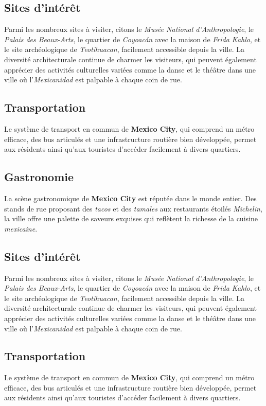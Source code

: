 \documentclass[12pt, a4paper]{article}
\begin{document}
\subsection*{\textbf{Sites d'intérêt}}

Parmi les nombreux sites à visiter, citons le \textit{Musée National d'Anthropologie}, le \textit{Palais des Beaux-Arts}, le quartier de \textit{Coyoacán} avec la maison de \textit{Frida Kahlo}, et le site archéologique de \textit{Teotihuacan}, facilement accessible depuis la ville.
La diversité architecturale continue de charmer les visiteurs, qui peuvent également apprécier des activités culturelles variées comme la danse et le théâtre dans une ville où l'\textit{Mexicanidad} est palpable à chaque coin de rue. \subsection*{\textbf{Transportation}} Le système de transport en commun de \textbf{Mexico City}, qui comprend un métro efficace, des bus articulés et une infrastructure routière bien développée, permet aux résidents ainsi qu'aux touristes d'accéder facilement à divers quartiers.

\subsection*{\textbf{Gastronomie}}

La scène gastronomique de \textbf{Mexico City} est réputée dans le monde entier. Des stands de rue proposant des \textit{tacos} et des \textit{tamales} aux restaurants étoilés \textit{Michelin}, la ville offre une palette de saveurs exquises qui reflètent la richesse de la cuisine \textit{mexicaine}.

\subsection*{\textbf{Sites d'intérêt}}



Parmi les nombreux sites à visiter, citons le \textit{Musée National d'Anthropologie}, le \textit{Palais des Beaux-Arts}, le quartier de \textit{Coyoacán} avec la maison de \textit{Frida Kahlo}, et le site archéologique de \textit{Teotihuacan}, facilement accessible depuis la ville.
La diversité architecturale continue de charmer les visiteurs, qui peuvent également apprécier des activités culturelles variées comme la danse et le théâtre dans une ville où l'\textit{Mexicanidad} est palpable à chaque coin de rue. \subsection*{\textbf{Transportation}} Le système de transport en commun de \textbf{Mexico City}, qui comprend un métro efficace, des bus articulés et une infrastructure routière bien développée, permet aux résidents ainsi qu'aux touristes d'accéder facilement à divers quartiers.
\end{document}
